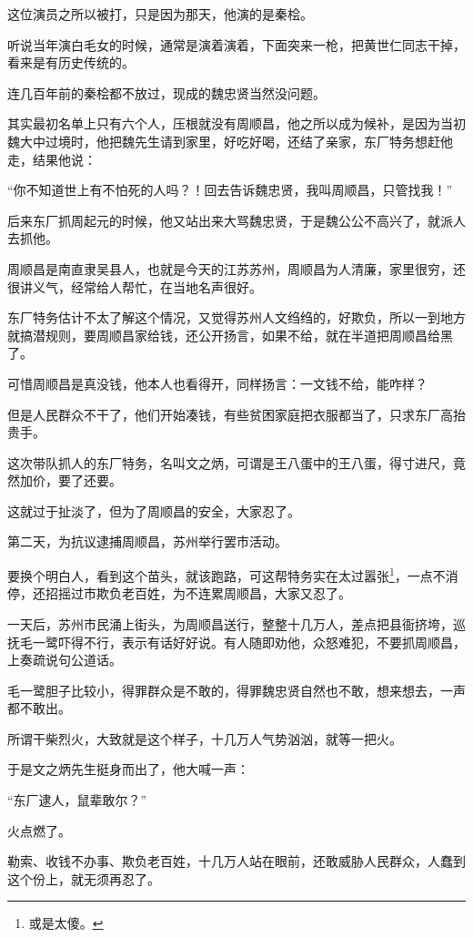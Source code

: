 \begin{multicols}{\theparacolNo}
		这位演员之所以被打，只是因为那天，他演的是秦桧。

		听说当年演白毛女的时候，通常是演着演着，下面突来一枪，把黄世仁同志干掉，看来是有历史传统的。

		连几百年前的秦桧都不放过，现成的魏忠贤当然没问题。

		其实最初名单上只有六个人，压根就没有周顺昌，他之所以成为候补，是因为当初魏大中过境时，他把魏先生请到家里，好吃好喝，还结了亲家，东厂特务想赶他走，结果他说：

		“你不知道世上有不怕死的人吗？！回去告诉魏忠贤，我叫周顺昌，只管找我！”

		后来东厂抓周起元的时候，他又站出来大骂魏忠贤，于是魏公公不高兴了，就派人去抓他。

		周顺昌是南直隶吴县人，也就是今天的江苏苏州，周顺昌为人清廉，家里很穷，还很讲义气，经常给人帮忙，在当地名声很好。

		东厂特务估计不太了解这个情况，又觉得苏州人文绉绉的，好欺负，所以一到地方就搞潜规则，要周顺昌家给钱，还公开扬言，如果不给，就在半道把周顺昌给黑了。

		可惜周顺昌是真没钱，他本人也看得开，同样扬言：一文钱不给，能咋样？

		但是人民群众不干了，他们开始凑钱，有些贫困家庭把衣服都当了，只求东厂高抬贵手。

		这次带队抓人的东厂特务，名叫文之炳，可谓是王八蛋中的王八蛋，得寸进尺，竟然加价，要了还要。

		这就过于扯淡了，但为了周顺昌的安全，大家忍了。

		第二天，为抗议逮捕周顺昌，苏州举行罢市活动。

		要换个明白人，看到这个苗头，就该跑路，可这帮特务实在太过嚣张\footnote{或是太傻。}，一点不消停，还招摇过市欺负老百姓，为不连累周顺昌，大家又忍了。

		一天后，苏州市民涌上街头，为周顺昌送行，整整十几万人，差点把县衙挤垮，巡抚毛一鹭吓得不行，表示有话好好说。有人随即劝他，众怒难犯，不要抓周顺昌，上奏疏说句公道话。

		毛一鹭胆子比较小，得罪群众是不敢的，得罪魏忠贤自然也不敢，想来想去，一声都不敢出。

		所谓干柴烈火，大致就是这个样子，十几万人气势汹汹，就等一把火。

		于是文之炳先生挺身而出了，他大喊一声：

		“东厂逮人，鼠辈敢尔？”

		火点燃了。

		勒索、收钱不办事、欺负老百姓，十几万人站在眼前，还敢威胁人民群众，人蠢到这个份上，就无须再忍了。


\end{multicols}
